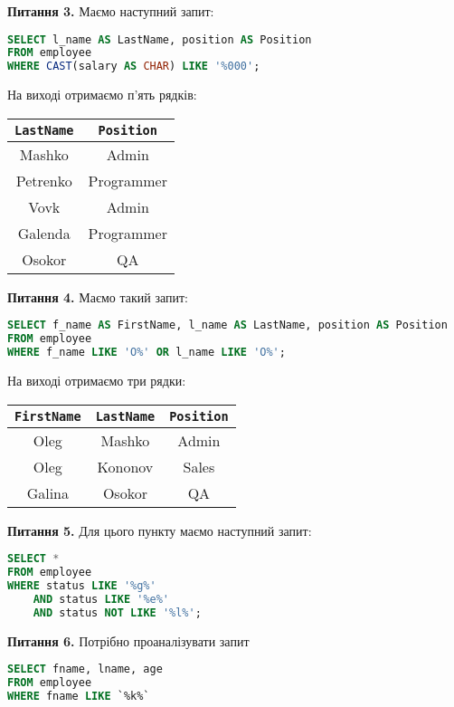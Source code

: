 \documentclass{hw_template}
\begin{document}
\textbf{Питання 3.} Маємо наступний запит:
\begin{lstlisting}[language=SQL]
SELECT l_name AS LastName, position AS Position
FROM employee
WHERE CAST(salary AS CHAR) LIKE '%000';
\end{lstlisting}

На виході отримаємо п'ять рядків:

\begin{table}[H]
    \centering
    \begin{tabular}{|c|c|}
        \hline
        \texttt{LastName} & \texttt{Position} \\
        \hline
        Mashko & Admin \\
Petrenko & Programmer \\
Vovk & Admin \\
Galenda & Programmer \\
Osokor & QA \\
        \hline
    \end{tabular}
\end{table}

\textbf{Питання 4.} Маємо такий запит:
\begin{lstlisting}[language=SQL]
SELECT f_name AS FirstName, l_name AS LastName, position AS Position
FROM employee
WHERE f_name LIKE 'O%' OR l_name LIKE 'O%';
\end{lstlisting}

На виході отримаємо три рядки:

\begin{table}[H]
    \centering
    \begin{tabular}{|c|c|c|}
        \hline
        \texttt{FirstName} & \texttt{LastName} & \texttt{Position} \\
        \hline
        Oleg & Mashko & Admin \\
        Oleg & Kononov & Sales \\
        Galina & Osokor & QA \\
        \hline
    \end{tabular}
\end{table}

\textbf{Питання 5.} Для цього пункту маємо наступний запит:
\begin{lstlisting}[language=SQL]
SELECT *
FROM employee
WHERE status LIKE '%g%' 
    AND status LIKE '%e%' 
    AND status NOT LIKE '%l%';
\end{lstlisting}

\textbf{Питання 6.} Потрібно проаналізувати запит
\begin{lstlisting}[language=SQL]
SELECT fname, lname, age 
FROM employee 
WHERE fname LIKE `%k%`
\end{lstlisting}
\end{document}
